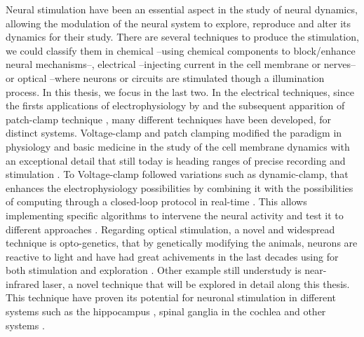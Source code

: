 Neural stimulation have been an essential aspect in the study of neural dynamics, allowing the modulation of the neural system to explore, reproduce and alter its dynamics for their study. There are several techniques to produce the stimulation, we could classify them in chemical --using chemical components to block/enhance neural mechanisms--, electrical --injecting current in the cell membrane or nerves-- or optical --where neurons or circuits are stimulated though a illumination process. In this thesis,  we focus in the last two. In the electrical techniques, since the firsts applications of electrophysiology by \cite{neher_single-channel_1976} and the subsequent apparition of patch-clamp technique \cite{hamill_improved_1981}, many different techniques have been developed, for distinct systems. Voltage-clamp and patch clamping modified the paradigm in physiology and basic medicine in the study of the cell membrane dynamics with an exceptional detail that still today is heading ranges of precise recording and stimulation \parencite{hamill_improved_1981}. To Voltage-clamp followed variations such as dynamic-clamp, that enhances the electrophysiology possibilities by combining it with the possibilities of computing through a closed-loop protocol in real-time \parencite{nowotny_dynamic_2022}. This allows implementing specific algorithms to intervene the neural activity and test it to different approaches \parencite{chamorro_generalization_2012}. 
Regarding optical stimulation, a novel and widespread technique is opto-genetics, that by genetically modifying the animals, neurons are reactive to light and have had great achivements in the last decades using for both stimulation and exploration \parencite{chen_roles_2022}. Other example still understudy is near-infrared laser, a novel technique that will be explored in detail along this thesis. This technique have proven its potential for neuronal stimulation in different systems such as the hippocampus \parencite{liang_temperature-dependent_2009}, spinal ganglia in the cochlea \cite{goyal_acute_2012, barrett_pulsed_2018, brown_thermal_2020} and other systems \parencite{shapiro_infrared_2012, cayce_infrared_2014, begeng_activity_2022}.

%

